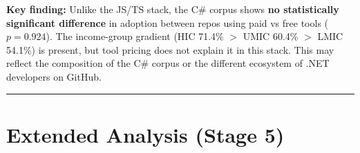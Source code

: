\documentclass[10pt,a4paper]{article}
\begin{document}
\vspace{4pt}
{\small \textbf{Key finding:} Unlike the JS/TS stack, the C\# corpus shows \textbf{no statistically
significant difference} in adoption between repos using paid vs free tools ($p = 0.924$). The
income-group gradient (HIC 71.4\% $>$ UMIC 60.4\% $>$ LMIC 54.1\%) is present, but tool pricing
does not explain it in this stack. This may reflect the composition of the C\# corpus or the
different ecosystem of .NET developers on GitHub.}

\vspace{6pt}
\hrule
\vspace{6pt}

\newpage
\section*{Extended Analysis (Stage 5)}
\end{document}
